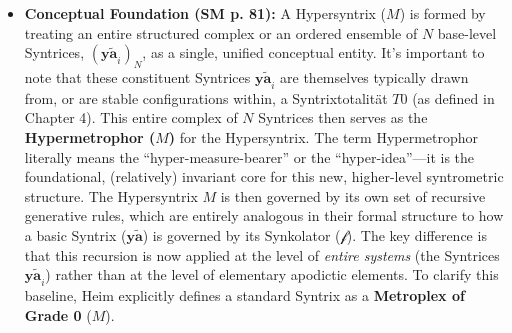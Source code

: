 \documentclass[12pt]{article}
\newcommand{\q}[1]{\enquote{#1}}
\newcommand{\syntrix}{\bm{y\widetilde{a}}}
\newcommand{\synkolator}{\mathcal{f}}
\newcommand{\syntrixtotalitaet}{T0}
\def\metroplex#1#2{M}%
\newcommand{\hypersyntrix}{\metroplex{1}{F}}
\newcommand{\hypermetrophor}[1]{%
  \metroplex{#1}{a}%
}
\begin{document}
\begin{itemize}
    \item \textbf{Conceptual Foundation (SM p. 81):}
    A Hypersyntrix (\(\hypersyntrix\)) is formed by treating an entire structured complex or an ordered ensemble of \( N \) base-level Syntrices, \( (\syntrix_i)_N \), as a single, unified conceptual entity. It's important to note that these constituent Syntrices \( \syntrix_i \) are themselves typically drawn from, or are stable configurations within, a Syntrixtotalität \( \syntrixtotalitaet \) (as defined in Chapter 4). This entire complex of \(N\) Syntrices then serves as the \textbf{Hypermetrophor (\( \hypermetrophor{1} \))} for the Hypersyntrix. The term Hypermetrophor literally means the \q{hyper-measure-bearer} or the \q{hyper-idea}—it is the foundational, (relatively) invariant core for this new, higher-level syntrometric structure. The Hypersyntrix \( \hypersyntrix \) is then governed by its own set of recursive generative rules, which are entirely analogous in their formal structure to how a basic Syntrix (\(\syntrix\)) is governed by its Synkolator (\(\synkolator\)). The key difference is that this recursion is now applied at the level of \textit{entire systems} (the Syntrices \( \syntrix_i \)) rather than at the level of elementary apodictic elements. To clarify this baseline, Heim explicitly defines a standard Syntrix as a \textbf{Metroplex of Grade 0} (\(\metroplex{0}{}\)).


\end{itemize}
\end{document}
